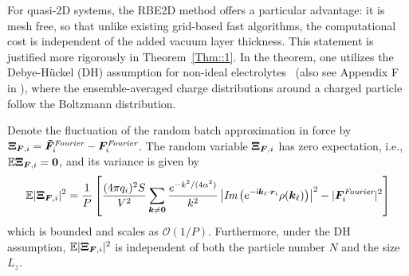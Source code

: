 
For quasi-2D systems, the RBE2D method offers a particular advantage: it is mesh free, so that unlike existing grid-based fast algorithms, the computational cost is independent   {of the} added vacuum layer thickness. This statement is justified more rigorously in Theorem~\ref{Thm::1}. 
 {In the theorem, one utilizes the Debye-H\"uckel (DH) assumption for non-ideal electrolytes~\cite{levin2002electrostatic} (also see Appendix F in \cite{gan2024fast}), where the ensemble-averaged charge distributions around a charged particle follow the Boltzmann distribution.
}

\begin{thm}\label{Thm::1} 
    Denote the fluctuation of the random batch approximation in force by $\boldsymbol{\Xi}_{\boldsymbol{F},i}=\boldsymbol{\tilde{F}}_i^{\emph{Fourier}}-\boldsymbol{F}_i^{\emph{Fourier}}$. The random variable $\boldsymbol{\Xi}_{\boldsymbol{F},i}$ has zero expectation, i.e., $\mathbb{E}\boldsymbol{\Xi}_{\boldsymbol{F},i}=\boldsymbol{0}$, and its variance is given by
    \begin{equation}\label{eq::30}
        \mathbb{E}|\boldsymbol{\Xi}_{\boldsymbol{F},i}|^2=\frac{1}{P}\left[\frac{(4\pi q_i)^2S}{V^2}\sum_{\bm{k}\neq \bm{0}}\frac{e^{-k^2/(4\alpha^2)}}{k^2}\left|\emph{Im}\left(e^{-\mathsf i \boldsymbol{k}_\ell\cdot \boldsymbol{r}_i}\rho(\boldsymbol{k}_\ell)\right)\right|^2-|\boldsymbol{F}_{i}^{\emph{Fourier}}|^2\right]
    \end{equation}
    which is bounded and scales as $\mathcal O(1/P)$. Furthermore, under the DH assumption, $\mathbb{E}|\boldsymbol{\Xi}_{\boldsymbol{F},i}|^2$ is independent of both the particle number $N$ and the size $L_z$.
\end{thm}

